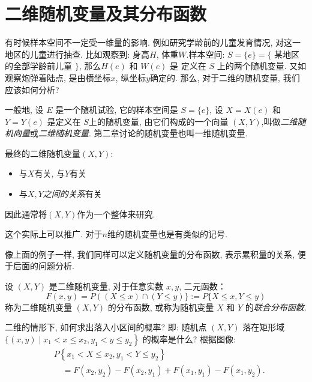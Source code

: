 \section{二维随机变量及其分布函数}

有时候样本空间不一定受一维量的影响. 例如研究学龄前的儿童发育情况, 对这一地区的儿童进行抽查.
比如观察到: 身高$H$, 体重$W$.样本空间: $S=\{e\}=\{$ 某地区的全部学龄前儿童 $\}$, 那么$H(e)$ 和 $W(e)$ 是 定义在 $S$ 上的两个随机变量.
又如观察炮弹着陆点, 是由横坐标$x$, 纵坐标$y$确定的. 那么, 对于二维的随机变量, 我们应该如何分析? 

\begin{definition}[二维随机变量]
  一般地, 设 $E$ 是一个随机试验, 它的样本空间是 $S=\{e\}$, 设 $X=X(e)$ 和 $Y=Y(e)$ 是定义在 $S$上的随机变量, 由它们构成的一个向量 $(X, Y)$,叫做\emph{二维随机向量}或\emph{二维随机变量}. 第二章讨论的随机变量也叫一维随机变量.
\end{definition}

最终的二维随机变量$(X,Y)$:
    \begin{itemize}
        \item 与$X$有关, 与$Y$有关
        \item 与$X,Y$\emph{之间的关系}有关
    \end{itemize}
  因此通常将$(X,Y)$作为一个整体来研究.

  \begin{remark}
    这个实际上可以推广. 对于$n$维的随机变量也是有类似的记号.  
  \end{remark}

  

  像上面的例子一样, 我们同样可以定义随机变量的分布函数, 表示累积量的关系, 便于后面的问题分析. 
  \begin{definition}[多维变量的分布函数]
    \label{def:cumdist}
    设 $(X, Y)$ 是二维随机变量, 对于任意实数 $x, y$, 二元函数：
    $$
        F(x, y)=P((X \leq x) \cap(Y \leq y)\} := P\{X \leq x, Y \leq y)
    $$
    称为二维随机变量 $(X, Y)$ 的分布函数, 或称为随机变量 $X$ 和 $Y$ 的\emph{联合分布函数}.
\end{definition}

二维的情形下, 如何求出落入小区间的概率? 即: 随机点 $(X, Y)$ 落在矩形域 $\{(x, y)\mid \left.x_1<x \leq x_2, y_1<y \leq y_2\right\}$ 的概率是什么?
  根据图像: 
  $$
        \begin{aligned}
             & P\left\{x_1<X \leq x_2, y_1<Y \leq y_2\right\}                                            \\
             & \quad=F\left(x_2, y_2\right)-F\left(x_2, y_1\right)+F\left(x_1, y_1\right)-F\left(x_1, y_2\right) .
        \end{aligned}
    $$

